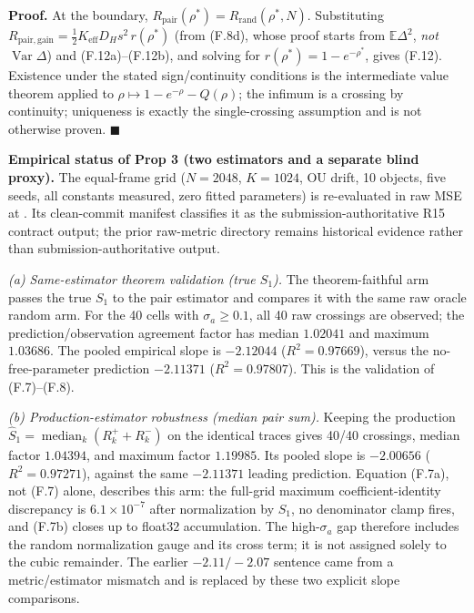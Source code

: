 \noindent\textbf{Proof.} At the boundary, $R_{\mathrm{pair}}(\rho^*)=R_{\mathrm{rand}}(\rho^*,N)$. Substituting $R_{\mathrm{pair,gain}}=\tfrac12K_{\mathrm{eff}}D_Hs^2\,r(\rho^*)$ (from (F.8d), whose proof starts from $\mathbb{E}\Delta^2$, \emph{not} $\operatorname{Var}\Delta$) and (F.12a)--(F.12b), and solving for $r(\rho^*)=1-e^{-\rho^*}$, gives (F.12). Existence under the stated sign/continuity conditions is the intermediate value theorem applied to $\rho\mapsto1-e^{-\rho}-Q(\rho)$; the infimum is a crossing by continuity; uniqueness is exactly the single-crossing assumption and is not otherwise proven. \hfill$\blacksquare$

\begin{statusblock}\textbf{Empirical status of Prop 3 (two estimators and a separate blind proxy).} The equal-frame grid ($N=2048$, $K=1024$, OU drift, 10 objects, five seeds, all constants measured, zero fitted parameters) is re-evaluated in raw MSE at . Its clean-commit manifest classifies it as the submission-authoritative R15 contract output; the prior raw-metric directory remains historical evidence rather than submission-authoritative output.

\emph{(a) Same-estimator theorem validation (true $S_1$).} The theorem-faithful arm passes the true $S_1$ to the pair estimator and compares it with the same raw oracle random arm. For the 40 cells with $\sigma_a\ge0.1$, all 40 raw crossings are observed; the prediction/observation agreement factor has median $1.02041$ and maximum $1.03686$. The pooled empirical slope is $-2.12044$ ($R^2=0.97669$), versus the no-free-parameter prediction $-2.11371$ ($R^2=0.97807$). This is the validation of (F.7)--(F.8).

\emph{(b) Production-estimator robustness (median pair sum).} Keeping the production $\widehat S_1=\operatorname{median}_k(R_k^++R_k^-)$ on the identical traces gives 40/40 crossings, median factor $1.04394$, and maximum factor $1.19985$. Its pooled slope is $-2.00656$ ($R^2=0.97271$), against the same $-2.11371$ leading prediction. Equation (F.7a), not (F.7) alone, describes this arm: the full-grid maximum coefficient-identity discrepancy is $6.1\times10^{-7}$ after normalization by $S_1$, no denominator clamp fires, and (F.7b) closes up to float32 accumulation. The high-$\sigma_a$ gap therefore includes the random normalization gauge and its cross term; it is not assigned solely to the cubic remainder. The earlier $-2.11/-2.07$ sentence came from a metric/estimator mismatch and is replaced by these two explicit slope comparisons.


\end{statusblock}
